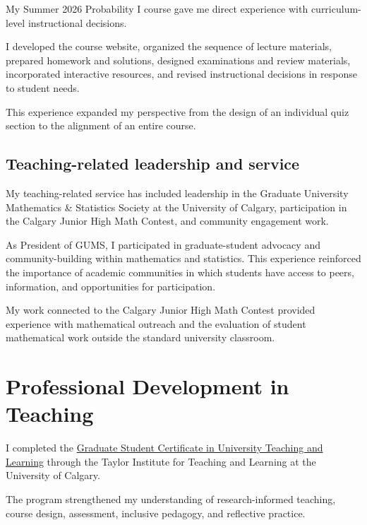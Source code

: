 \documentclass[11pt]{article}
\begin{document}
My Summer 2026 Probability I course gave me direct experience
with curriculum-level instructional decisions.

I developed the course website,
organized the sequence of lecture materials,
prepared homework and solutions,
designed examinations and review materials,
incorporated interactive resources,
and revised instructional decisions in response to student
needs.

This experience expanded my perspective from the design of an
individual quiz section to the alignment of an entire course.

\subsection{Teaching-related leadership and service}

My teaching-related service has included leadership in the
Graduate University Mathematics \& Statistics Society at the
University of Calgary,
participation in the Calgary Junior High Math Contest,
and community engagement work.

As President of GUMS,
I participated in graduate-student advocacy and
community-building within mathematics and statistics.
This experience reinforced the importance of academic
communities in which students have access to peers,
information,
and opportunities for participation.

My work connected to the Calgary Junior High Math Contest
provided experience with mathematical outreach and the
evaluation of student mathematical work outside the standard
university classroom.


\section{Professional Development in Teaching}

I completed the
\href{https://taylorinstitute.ucalgary.ca/programs-and-courses/programs/certificate}
{Graduate Student Certificate in University Teaching and Learning}
through the Taylor Institute for Teaching and Learning at the
University of Calgary.

The program strengthened my understanding of
research-informed teaching,
course design,
assessment,
inclusive pedagogy,
and reflective practice.
\end{document}
